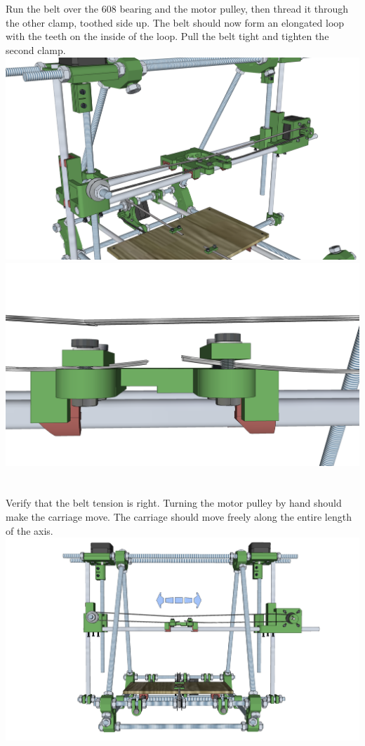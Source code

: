 \documentclass[twoside,a4paper,titlepage]{memoir}
\begin{document}
	\section{}
	Run the belt over the 608 bearing and the motor pulley, then thread it through the other clamp, toothed
	side up. The belt should now form an elongated loop with the teeth on the inside of the loop. Pull the
	belt tight and tighten the second clamp.\\
	\includegraphics[width=1\linewidth]{graphics/ch9_15_1.png}
	\includegraphics[width=1\linewidth]{graphics/ch9_15_2.png}
	
	\section{}
	Verify that the belt tension is right. Turning the motor pulley by hand should make the carriage move.
	The carriage should move freely along the entire length of the axis.\\
	\includegraphics[width=1\linewidth]{graphics/ch9_16.png}
	
\end{document}
